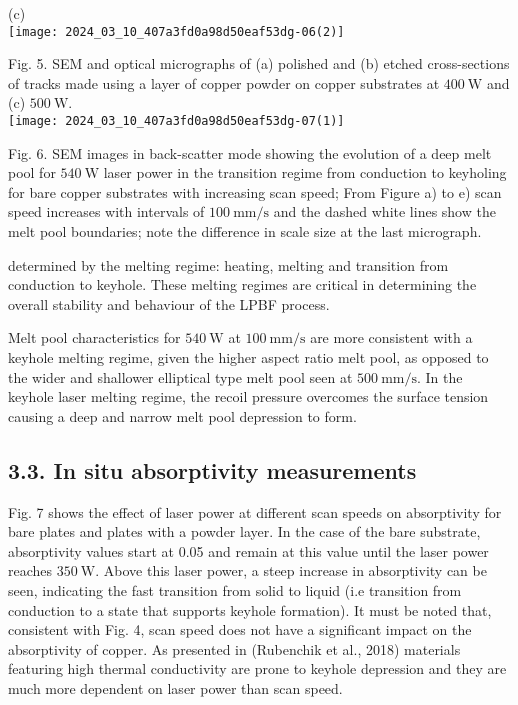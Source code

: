 \documentclass[10pt]{article}
\begin{document}
(c)\\
\texttt{[image: 2024\_03\_10\_407a3fd0a98d50eaf53dg-06(2)]}

Fig. 5. SEM and optical micrographs of (a) polished and (b) etched cross-sections of tracks made using a layer of copper powder on copper substrates at $400 \mathrm{~W}$ and (c) $500 \mathrm{~W}$.\\
\texttt{[image: 2024\_03\_10\_407a3fd0a98d50eaf53dg-07(1)]}

Fig. 6. SEM images in back-scatter mode showing the evolution of a deep melt pool for $540 \mathrm{~W}$ laser power in the transition regime from conduction to keyholing for bare copper substrates with increasing scan speed; From Figure a) to e) scan speed increases with intervals of $100 \mathrm{~mm} / \mathrm{s}$ and the dashed white lines show the melt pool boundaries; note the difference in scale size at the last micrograph.

determined by the melting regime: heating, melting and transition from conduction to keyhole. These melting regimes are critical in determining the overall stability and behaviour of the LPBF process.

Melt pool characteristics for $540 \mathrm{~W}$ at $100 \mathrm{~mm} / \mathrm{s}$ are more consistent with a keyhole melting regime, given the higher aspect ratio melt pool, as opposed to the wider and shallower elliptical type melt pool seen at $500 \mathrm{~mm} / \mathrm{s}$. In the keyhole laser melting regime, the recoil pressure overcomes the surface tension causing a deep and narrow melt pool depression to form.

\subsection*{3.3. In situ absorptivity measurements}
Fig. 7 shows the effect of laser power at different scan speeds on absorptivity for bare plates and plates with a powder layer. In the case of the bare substrate, absorptivity values start at 0.05 and remain at this value until the laser power reaches $350 \mathrm{~W}$. Above this laser power, a steep increase in absorptivity can be seen, indicating the fast transition from solid to liquid (i.e transition from conduction to a state that supports keyhole formation). It must be noted that, consistent with Fig. 4, scan speed does not have a significant impact on the absorptivity of copper. As presented in (Rubenchik et al., 2018) materials featuring high thermal conductivity are prone to keyhole depression and they are much more dependent on laser power than scan speed.
\end{document}
